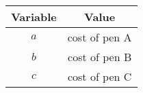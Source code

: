 \begin{tabular}{|c|c|}
\hline
\textbf{Variable} & \textbf{Value} \\
\hline
$a$ & cost of pen A \\
\hline
$b$ & cost of pen B \\
\hline
$c$ & cost of pen C \\
\hline
\end{tabular}